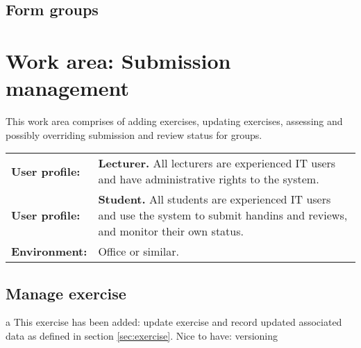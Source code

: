 \documentclass[Main]{subfiles}
\begin{document}
\subsection{Form groups} \label{sec:FormGroups}

\begin{DataIntro}
\end{DataIntro}

\begin{TaskTable}
\end{TaskTable}

\newpage

\section{Work area: Submission management}
This work area comprises of adding exercises, updating exercises, assessing and possibly overriding submission and review status for groups.

\begin{tabular}{l  p{13cm}}
 \textbf{User profile:} & \textbf{Lecturer.} All lecturers are experienced IT users and have administrative rights to the system. \\
 \textbf{User profile:} & \textbf{Student.} All students are experienced IT users and use the system to submit handins and reviews, and monitor their own status.  \\
 \textbf{Environment:} & Office or similar.
\end{tabular}

\subsection{Manage exercise} \label{sec:ManageExercise}

\begin{DataIntro}
\end{DataIntro}

\begin{TaskTable}
\RecordAddi
{a}
{This exercise has been added: update exercise and record updated associated data as defined in section \ref{sec:exercise}. }{Nice to have: versioning}{}

\end{TaskTable}
\end{document}
